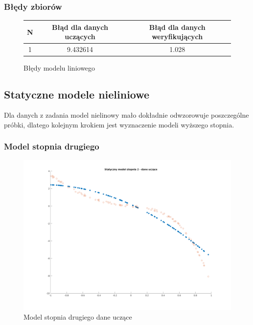 \documentclass[a4paper, 11pt]{article}
\begin{document}
\subsubsection{Błędy zbiorów}
\begin{figure}[H]
\centering
\begin{tabular}{|c|c|c|}
\hline
	N & Błąd dla danych uczących & Błąd dla danych weryfikujących\\
\hline
	1 & 9.432614 & 1.028\\
\hline
\end{tabular}
\caption{Błędy modelu liniowego}
\end{figure}


\subsection{Statyczne modele nieliniowe}
Dla danych z zadania model nielinowy mało dokładnie odwzorowuje poszczególne próbki, dlatego kolejnym krokiem jest wyznaczenie modeli wyższego stopnia. 

\subsubsection{Model stopnia drugiego}
\begin{figure}[H]
\centering
\includegraphics[scale=0.50]{dane_stat_2_ucz.png}
\caption{Model stopnia drugiego dane uczące}
\label{}
\end{figure}
\end{document}
